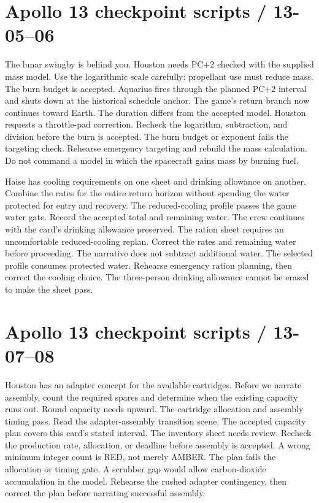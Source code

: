 \section*{Apollo 13 checkpoint scripts / 13-05--06}
{The lunar swingby is behind you.
Houston needs PC+2 checked with the supplied mass model.
Use the logarithmic scale carefully: propellant use must reduce mass.}
{The burn budget is accepted.
Aquarius fires through the planned PC+2 interval and shuts down
at the historical schedule anchor. The game's return branch
now continues toward Earth.}
{The duration differs from the accepted model.
Houston requests a throttle-pad correction.
Recheck the logarithm, subtraction, and division before the burn is accepted.}
{The burn budget or exponent fails the targeting check.
Rehearse emergency targeting and rebuild the mass calculation.
Do not command a model in which the spacecraft gains mass by burning fuel.}

{Haise has cooling requirements on one sheet and drinking allowance
on another. Combine the rates for the entire return horizon
without spending the water protected for entry and recovery.}
{The reduced-cooling profile passes the game water gate.
Record the accepted total and remaining water.
The crew continues with the card's drinking allowance preserved.}
{The ration sheet requires an uncomfortable reduced-cooling replan.
Correct the rates and remaining water before proceeding.
The narrative does not subtract additional water.}
{The selected profile consumes protected water.
Rehearse emergency ration planning, then correct the cooling choice.
The three-person drinking allowance cannot be erased to make the sheet pass.}

\clearpage
\section*{Apollo 13 checkpoint scripts / 13-07--08}
{Houston has an adapter concept for the available cartridges.
Before we narrate assembly, count the required spares and determine
when the existing capacity runs out. Round capacity needs upward.}
{The cartridge allocation and assembly timing pass.
Read the adapter-assembly transition scene.
The accepted capacity plan covers this card's stated interval.}
{The inventory sheet needs review.
Recheck the production rate, allocation, or deadline before assembly
is accepted. A wrong minimum integer count is RED, not merely AMBER.}
{The plan fails the allocation or timing gate.
A scrubber gap would allow carbon-dioxide accumulation in the model.
Rehearse the rushed adapter contingency, then correct the plan
before narrating successful assembly.}

